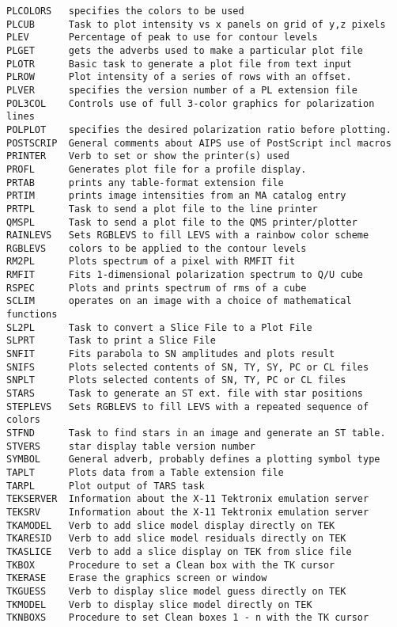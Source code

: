 \begin{verbatim}
PLCOLORS   specifies the colors to be used
PLCUB      Task to plot intensity vs x panels on grid of y,z pixels
PLEV       Percentage of peak to use for contour levels
PLGET      gets the adverbs used to make a particular plot file
PLOTR      Basic task to generate a plot file from text input
PLROW      Plot intensity of a series of rows with an offset.
PLVER      specifies the version number of a PL extension file
POL3COL    Controls use of full 3-color graphics for polarization lines
POLPLOT    specifies the desired polarization ratio before plotting.
POSTSCRIP  General comments about AIPS use of PostScript incl macros
PRINTER    Verb to set or show the printer(s) used
PROFL      Generates plot file for a profile display.
PRTAB      prints any table-format extension file
PRTIM      prints image intensities from an MA catalog entry
PRTPL      Task to send a plot file to the line printer
QMSPL      Task to send a plot file to the QMS printer/plotter
RAINLEVS   Sets RGBLEVS to fill LEVS with a rainbow color scheme
RGBLEVS    colors to be applied to the contour levels
RM2PL      Plots spectrum of a pixel with RMFIT fit
RMFIT      Fits 1-dimensional polarization spectrum to Q/U cube
RSPEC      Plots and prints spectrum of rms of a cube
SCLIM      operates on an image with a choice of mathematical functions
SL2PL      Task to convert a Slice File to a Plot File
SLPRT      Task to print a Slice File
SNFIT      Fits parabola to SN amplitudes and plots result
SNIFS      Plots selected contents of SN, TY, SY, PC or CL files
SNPLT      Plots selected contents of SN, TY, PC or CL files
STARS      Task to generate an ST ext. file with star positions
STEPLEVS   Sets RGBLEVS to fill LEVS with a repeated sequence of colors
STFND      Task to find stars in an image and generate an ST table.
STVERS     star display table version number
SYMBOL     General adverb, probably defines a plotting symbol type
TAPLT      Plots data from a Table extension file
TARPL      Plot output of TARS task
TEKSERVER  Information about the X-11 Tektronix emulation server
TEKSRV     Information about the X-11 Tektronix emulation server
TKAMODEL   Verb to add slice model display directly on TEK
TKARESID   Verb to add slice model residuals directly on TEK
TKASLICE   Verb to add a slice display on TEK from slice file
TKBOX      Procedure to set a Clean box with the TK cursor
TKERASE    Erase the graphics screen or window
TKGUESS    Verb to display slice model guess directly on TEK
TKMODEL    Verb to display slice model directly on TEK
TKNBOXS    Procedure to set Clean boxes 1 - n with the TK cursor

\end{verbatim}
